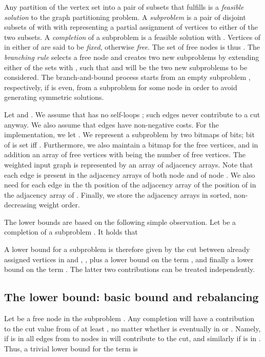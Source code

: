 \documentclass[a4paper,11pt]{article}
\begin{document}
Any partition of the vertex set  into a pair of subsets 
that fulfills  is a \emph{feasible solution} to the
graph partitioning problem.  A \emph{subproblem} is a pair 
of disjoint subsets of  with with 
representing a partial assignment of vertices to either of the two
subsets. A \emph{completion} of a subproblem  is a feasible
solution  with . Vertices of  in
either of  are said to be \emph{fixed}, otherwise \emph{free}.
The set of free nodes is thus . The
\emph{branching rule} selects a free node  and creates two new
subproblems by extending either of the sets  with , such that
 and  will be the two new
subproblems to be considered. The branch-and-bound process starts from
an empty subproblem , respectively, if  is
even, from a subproblem  for some node  in order to
avoid generating symmetric solutions.

Let  and . We assume that  has no self-loops ;
such edges never contribute to a cut anyway. We also assume that edges
 have non-negative costs. For the implementation, we let
. We represent a subproblem  by two
bitmaps  of  bits; bit  of  is set iff . Furthermore, we also maintain a bitmap for the free vertices,
and in addition an array of free vertices with 
being the number of free vertices. The weighted input graph  is
represented by an array of adjacency arrays. Note that each edge
 is present in the adjacency arrays of both node  and
of node . We also need for each edge  in the th position
of the adjacency array of  the position  of  in the adjacency
array of . Finally, we store the adjacency arrays in sorted,
non-decreasing weight order.

The lower bounds are based on the following simple observation.  Let
 be a completion of a subproblem . It holds that

A lower bound for a subproblem  is therefore given by the
cut between already assigned vertices in  and , ,
plus a lower bound on the term , and finally a lower bound on the term
. The latter two contributions
can be treated independently.

\subsection{The lower bound: basic bound and rebalancing}
\label{sec:basicrebalance}

Let  be a free node in the subproblem . Any
completion  will have a contribution to the cut value from
 of at least , no matter whether  is
eventually in  or . Namely, if  is in  all
edges from  to nodes in  will contribute to the cut, and
similarly if  is in . Thus, a trivial lower bound for
the term   is
\end{document}
